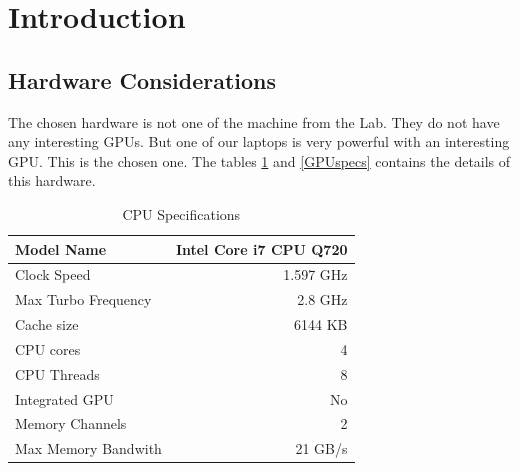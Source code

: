 \documentclass[fleqn,11pt]{SelfArx} %
\affiliation{\textsuperscript{1}RB812 \hfill \textsuperscript{2}AC5612 \hfill \textsuperscript{3}GF210}
\begin{document}



\flushbottom %

\maketitle %

\tableofcontents %

\thispagestyle{empty} %

\section{Introduction}


\subsection{Hardware Considerations}

The chosen hardware is not one of the machine from the Lab. They do not have any interesting GPUs. But one of our laptops is very powerful with an interesting GPU. This is the chosen one. The tables \ref{CPUspec} and \ref{GPUspecs} contains the details of this hardware.
\begin{table}[h]
\centering
\begin{tabular}{|l|r|}
\hline
Model Name & Intel Core i7 CPU Q720 \\
\hline
Clock Speed & 1.597 GHz \\
\hline
Max Turbo Frequency & 2.8 GHz \\
\hline
Cache size & 6144 KB \\
\hline
CPU cores & 4 \\
\hline
CPU Threads & 8 \\
\hline
Integrated GPU & No \\
\hline
Memory Channels & 2 \\
\hline
Max Memory Bandwith & 21 GB/s \\
\hline
\end{tabular}
\caption{CPU Specifications}
\label{CPUspec}
\end{table}
\end{document}
